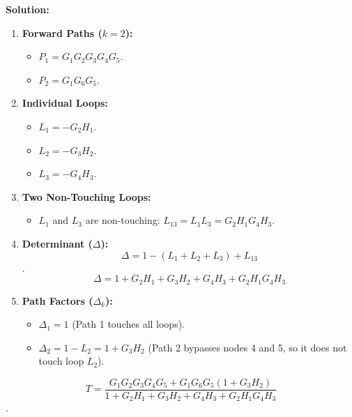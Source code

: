 \documentclass[12pt]{article}
\begin{document}
\textbf{Solution:}
\begin{enumerate}
    \item \textbf{Forward Paths ($k=2$):}
    \begin{itemize}
        \item $P_1 = G_1 G_2 G_3 G_4 G_5$.
        \item $P_2 = G_1 G_6 G_5$.
    \end{itemize}
    
    \item \textbf{Individual Loops:}
    \begin{itemize}
        \item $L_1 = -G_2 H_1$.
        \item $L_2 = -G_3 H_2$.
        \item $L_3 = -G_4 H_3$.
    \end{itemize}
    
    \item \textbf{Two Non-Touching Loops:}
    \begin{itemize}
        \item $L_1$ and $L_3$ are non-touching: $L_{13} = L_1 L_3 = G_2 H_1 G_4 H_3$.
    \end{itemize}
    
    \item \textbf{Determinant ($\Delta$):}
    \[ \Delta = 1 - (L_1 + L_2 + L_3) + L_{13} \].
    \[ \Delta = 1 + G_2 H_1 + G_3 H_2 + G_4 H_3 + G_2 H_1 G_4 H_3 \]
    
    \item \textbf{Path Factors ($\Delta_k$):}
    \begin{itemize}
        \item $\Delta_1 = 1$ (Path 1 touches all loops).
        \item $\Delta_2 = 1 - L_2 = 1 + G_3 H_2$ (Path 2 bypasses nodes 4 and 5, so it does not touch loop $L_2$).
    \end{itemize}
\end{enumerate}

\[ T = \frac{G_1 G_2 G_3 G_4 G_5 + G_1 G_6 G_5(1 + G_3 H_2)}{1 + G_2 H_1 + G_3 H_2 + G_4 H_3 + G_2 H_1 G_4 H_3} \].
\end{document}
